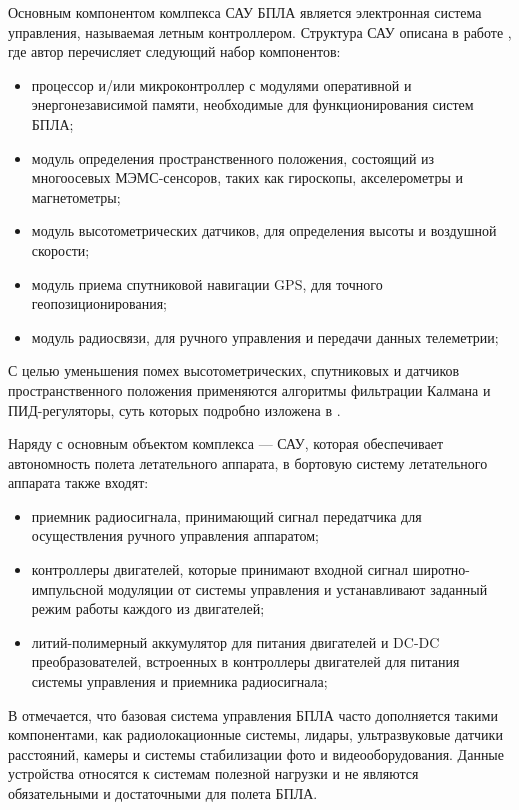 \documentclass[pract, och, master]{SCWorks}
\begin{document}
Основным компонентом комлпекса САУ БПЛА является электронная система управления, называемая летным контроллером. 
Структура САУ описана в работе \cite{ShilovMFTI}, где автор перечисляет следующий набор компонентов:
\begin{itemize}
	\item процессор и/или микроконтроллер с модулями оперативной и энергонезависимой памяти, необходимые для функционирования систем БПЛА;
	\item модуль определения пространственного положения, состоящий из многоосевых МЭМС-сенсоров, таких как гироскопы, акселерометры и магнетометры;
	\item модуль высотометрических датчиков, для определения высоты и воздушной скорости;
	\item модуль приема спутниковой навигации GPS, для точного геопозиционирования;
	\item модуль радиосвязи, для ручного управления и передачи данных телеметрии;
\end{itemize}

С целью уменьшения помех высотометрических, спутниковых и датчиков пространственного положения применяются алгоритмы фильтрации Калмана и ПИД-регуляторы, суть которых 
подробно изложена в \cite{filter}.

Наряду с основным объектом комплекса --- САУ, которая обеспечивает 
автономность полета летательного аппарата, в бортовую систему летательного аппарата также входят:
\begin{itemize}
	\item приемник радиосигнала, принимающий сигнал передатчика для осуществления ручного управления аппаратом;
	\item контроллеры двигателей, которые принимают входной сигнал широтно-импульсной
	модуляции от системы управления и устанавливают заданный режим работы каждого из двигателей;
	\item  литий-полимерный аккумулятор для питания двигателей и DC-DC преобразователей, встроенных в контроллеры двигателей для
питания системы управления и приемника радиосигнала;
\end{itemize}
  
В \cite{uvDev} отмечается, что базовая система управления БПЛА часто дополняется такими компонентами, 
как радиолокационные системы, лидары, ультразвуковые датчики расстояний, камеры и системы 
стабилизации фото и видеооборудования. Данные устройства относятся к системам полезной
нагрузки и не являются обязательными и достаточными для полета БПЛА.
\end{document}
